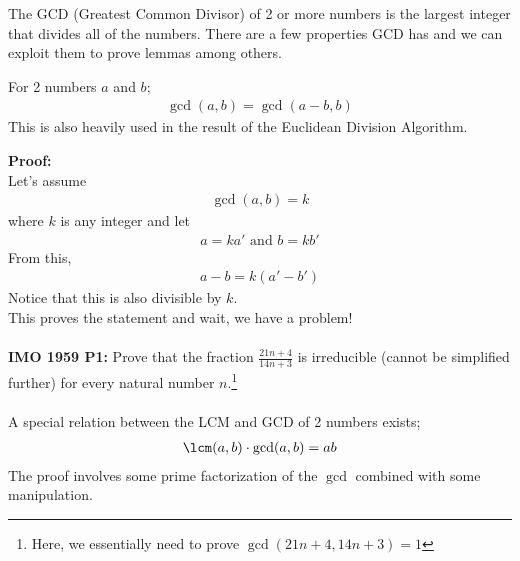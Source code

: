 \begin{mathbox}{}
{The GCD (Greatest Common Divisor) of 2 or more numbers is the largest integer that divides all of the numbers. There are a few properties GCD has and we can exploit them to prove lemmas among others.

For 2 numbers $a$ and $b$;
\begin{align*}
    \gcd(a,b) = \gcd(a-b, b)
\end{align*}
This is also heavily used in the result of the Euclidean Division Algorithm. 

\textbf{Proof:}\\
Let's assume 
\begin{align*}
    \gcd(a,b) = k
\end{align*} where $k$ is any integer and let 
\begin{align*}
    a = ka' \text{ and } b = kb'
\end{align*}
From this, 
\begin{align*}
    a-b = k(a'-b')
\end{align*}
Notice that this is also divisible by $k.$ \\
This proves the statement and wait, we have a problem!
\\\\
\textbf{IMO 1959 P1:} Prove that the fraction $\frac{21n+4}{14n+3}$ is irreducible (cannot be simplified further) for every natural number $n$.\footnote{Here, we essentially need to prove $\gcd(21n+4, 14n+3) = 1$}
\\\\
A special relation between the LCM and GCD of 2 numbers exists;
\begin{align*}
    \lcm(a,b) \cdot \gcd(a,b) = ab
\end{align*}
The proof involves some prime factorization of the $\gcd$ combined with some manipulation.}
\end{mathbox}
